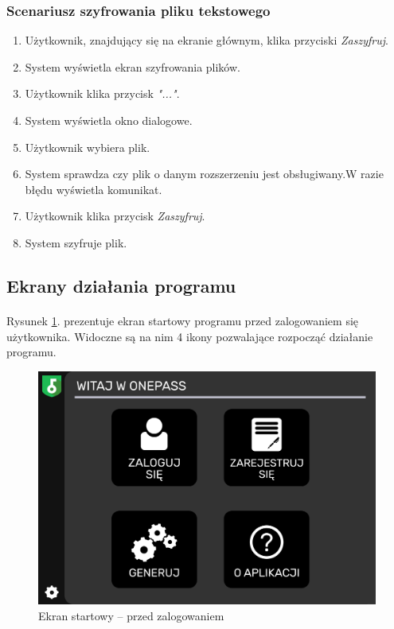 \documentclass[a4paper]{article}
\begin{document}
\subsubsection{Scenariusz szyfrowania pliku tekstowego}
\begin{enumerate}
    \item Użytkownik, znajdujący się na ekranie głównym, klika przyciski \textit{Zaszyfruj}.
    \item System wyświetla ekran szyfrowania plików.
    \item Użytkownik klika przycisk \textit{"..."}.
    \item System wyświetla okno dialogowe.
    \item Użytkownik wybiera plik.
    \item System sprawdza czy plik o danym rozszerzeniu jest obsługiwany.W razie błędu wyświetla komunikat.
    \item Użytkownik klika przycisk \textit{Zaszyfruj}.
    \item System szyfruje plik.
\end{enumerate}

\newpage

\subsection{Ekrany działania programu}
\paragraph{}Rysunek \ref{fig:startPrzed}. prezentuje ekran startowy programu przed zalogowaniem się użytkownika. Widoczne są na nim 4 ikony pozwalające rozpocząć działanie programu.
\begin{figure}[H]
    \centering
    \includegraphics[width=1\textwidth]{img/ekran_przed_zalogowaniem.png}
    \caption{Ekran startowy -- przed zalogowaniem}
    \label{fig:startPrzed}
\end{figure}
\end{document}
